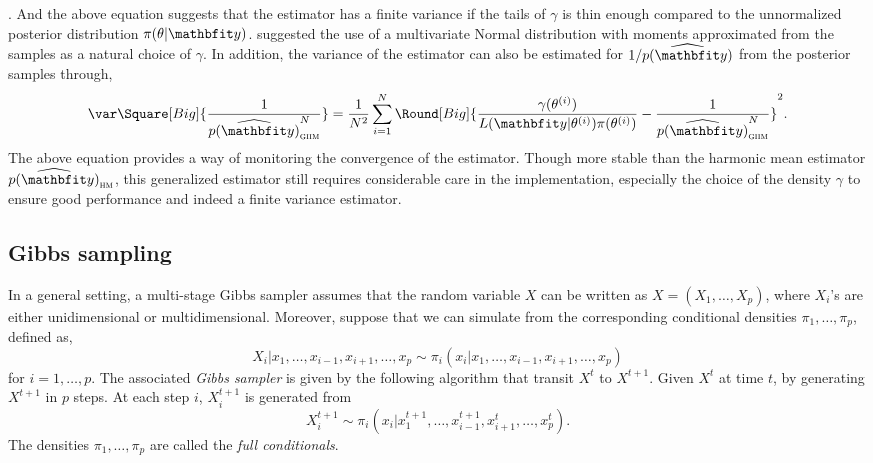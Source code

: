 \cite{Kass:1995vb}. And the above equation suggests that the estimator has a
finite variance if the tails of $\gamma$ is thin enough compared to the
unnormalized posterior distribution $\pi(\theta|\data)$.
\cite{Gelfand:1994ux} suggested the use of a multivariate Normal distribution
with moments approximated from the samples as a natural choice of $\gamma$. In
addition, the variance of the estimator can also be estimated for
$1/\widehat{p(\data)}$ from the posterior samples through,
\begin{equation}
  \var\Square[Big]{\frac{1}{\widehat{p(\data)}_{\text{\textsc{ghm}}}^N}} =
  \frac{1}{N^2}\sum_{i=1}^N \Round[Big]{
    \frac{\gamma(\supi\theta)}{L(\data|\supi\theta)\pi(\supi\theta)}
    - \frac{1}{\widehat{p(\data)}_{\text{\textsc{ghm}}}^N}}^2.
\end{equation}
The above equation provides a way of monitoring the convergence of the
estimator. Though more stable than the harmonic mean estimator
$\widehat{p(\data)}_{\text{\textsc{hm}}}$, this generalized estimator still
requires considerable care in the implementation, especially the choice of the
density $\gamma$ to ensure good performance and indeed a finite variance
estimator.

\subsection{Gibbs sampling}
\label{sub:Gibbs sampling}

In a general setting, a multi-stage Gibbs sampler assumes that the random
variable $X$ can be written as $X = (X_1,\dots,X_p)$, where $X_i$'s are either
unidimensional or multidimensional. Moreover, suppose that we can simulate
from the corresponding conditional densities $\pi_1,\dots,\pi_p$, defined as,
\begin{equation}
  X_i|x_1,\dots,x_{i-1},x_{i+1},\dots,x_p
  \sim \pi_i(x_i|x_1,\dots,x_{i-1},x_{i+1},\dots,x_p)
\end{equation}
for $i = 1,\dots,p$. The associated \emph{Gibbs sampler} is given by the
following algorithm that transit $X^t$ to $X^{t+1}$. Given $X^t$ at time $t$,
by generating $X^{t+1}$ in $p$ steps. At each step $i$, $X_i^{t+1}$ is
generated from
\begin{equation}
  X_i^{t+1} \sim
  \pi_i(x_i|x_1^{t+1},\dots,x_{i-1}^{t+1},x_{i+1}^t,\dots,x_p^t).
\end{equation}
The densities $\pi_1,\dots,\pi_p$ are called the \emph{full conditionals}.

